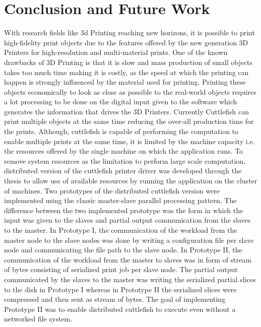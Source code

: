 \newpage   
\chapter{Conclusion and Future Work}

With research fields like 3d Printing reaching new horizons, it is possible to print high-fidelity print objects due to the features offered by the new generation 3D Printers for high-resolution and multi-material prints. One of the known drawbacks of 3D Printing is that it is slow and mass production of small objects takes too much time making it is costly, as the speed at which the printing can happen is strongly influenced by the material used for printing. Printing these objects economically to look as close as possible to the real-world objects requires a lot processing to be done on the digital input given to the software which generates the information that drives the 3D Printers. Currently Cuttlefish can print multiple objects at the same time reducing the over-all production time for the prints. Although, cuttlefish is capable of performing the computation to enable multiple prints at the same time, it is limited by the machine capacity i.e. the resources offered by the single machine on which the application runs. \newline
To remove system resources as the limitation to perform large scale computation, distributed version of the cuttlefish printer driver was developed through the thesis to allow use of available resources by running the application on the cluster of machines. Two prototypes of the distributed cuttlefish version were implemented using the classic master-slave parallel processing pattern. The difference between the two implemented prototype was the form in which the input was given to the slaves and partial output communication from the slaves to the master. In Prototype I, the communication of the workload from the master node to the slave nodes was done by writing a configuration file per slave node and communicating the file path to the slave node. In Prototype II, the communication of the workload from the master to slaves was in form of stream of bytes consisting of serialized print job per slave node. The partial output communicated by the slaves to the master was writing the serialized partial slices to the disk in Prototype I whereas in Prototype II the serialized slices were compressed and then sent as stream of bytes. The goal of implementing Prototype II was to enable distributed cuttlefish to execute even without a networked file system.\newline 

